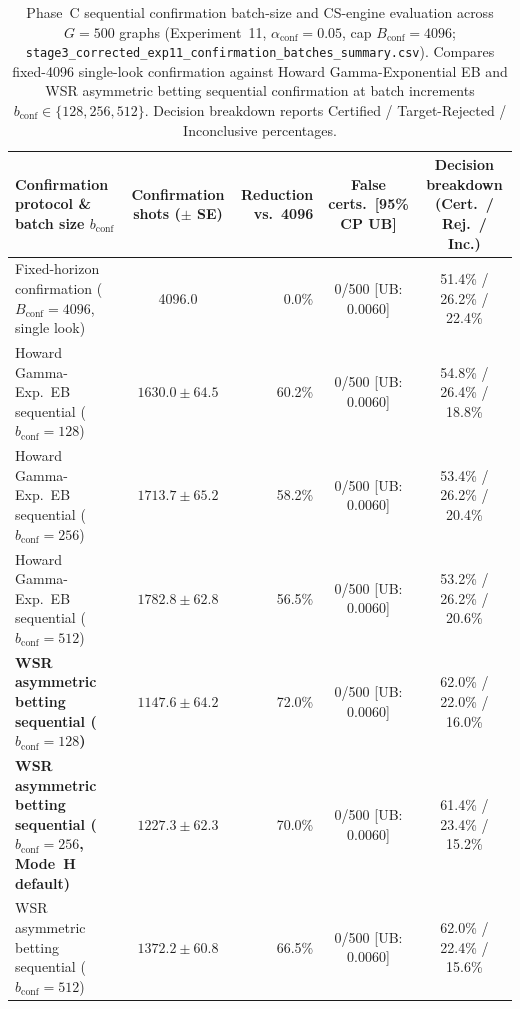 \begin{table}[htbp]
\caption{Phase~C sequential confirmation batch-size and CS-engine evaluation across $G=500$ graphs (Experiment~11, $\alpha_{\mathrm{conf}}=0.05$, cap $B_{\mathrm{conf}}=4096$; \texttt{stage3\_corrected\_exp11\_confirmation\_batches\_summary.csv}). Compares fixed-4096 single-look confirmation against Howard Gamma-Exponential EB and WSR asymmetric betting sequential confirmation at batch increments $b_{\mathrm{conf}} \in \{128, 256, 512\}$. Decision breakdown reports Certified / Target-Rejected / Inconclusive percentages.}
\label{tab:confirmation_batches}
\centering
\footnotesize
\begin{tabular}{@{}l c r c c@{}}
\toprule
Confirmation protocol \& batch size $b_{\mathrm{conf}}$ & Confirmation shots ($\pm$ SE) & Reduction vs.\ 4096 & False certs.\ [95\% CP UB] & Decision breakdown (Cert.\ / Rej.\ / Inc.) \\
\midrule
Fixed-horizon confirmation ($B_{\mathrm{conf}}=4096$, single look) & 4096.0 & 0.0\% & 0/500 [UB: 0.0060] & 51.4\% / 26.2\% / 22.4\% \\
Howard Gamma-Exp.\ EB sequential ($b_{\mathrm{conf}}=128$) & $1630.0 \pm 64.5$ & 60.2\% & 0/500 [UB: 0.0060] & 54.8\% / 26.4\% / 18.8\% \\
Howard Gamma-Exp.\ EB sequential ($b_{\mathrm{conf}}=256$) & $1713.7 \pm 65.2$ & 58.2\% & 0/500 [UB: 0.0060] & 53.4\% / 26.2\% / 20.4\% \\
Howard Gamma-Exp.\ EB sequential ($b_{\mathrm{conf}}=512$) & $1782.8 \pm 62.8$ & 56.5\% & 0/500 [UB: 0.0060] & 53.2\% / 26.2\% / 20.6\% \\
\textbf{WSR asymmetric betting sequential ($b_{\mathrm{conf}}=128$)} & $1147.6 \pm 64.2$ & 72.0\% & 0/500 [UB: 0.0060] & 62.0\% / 22.0\% / 16.0\% \\
\textbf{WSR asymmetric betting sequential ($b_{\mathrm{conf}}=256$, Mode~H default)} & $1227.3 \pm 62.3$ & 70.0\% & 0/500 [UB: 0.0060] & 61.4\% / 23.4\% / 15.2\% \\
WSR asymmetric betting sequential ($b_{\mathrm{conf}}=512$) & $1372.2 \pm 60.8$ & 66.5\% & 0/500 [UB: 0.0060] & 62.0\% / 22.4\% / 15.6\% \\
\bottomrule
\end{tabular}
\end{table}
